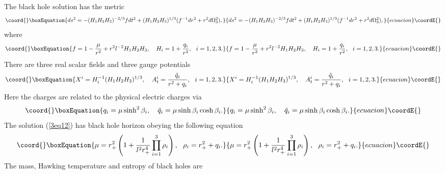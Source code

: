 \documentclass[a4paper,12pt]{article}
\begin{document}
The black hole solution has the metric
\begin{equation}\coord{}\boxEquation{
\label{3eq12}
ds^2 =-(H_1H_2H_3)^{-2/3} fdt^2 +(H_1H_2H_3)^{1/3}(f^{-1}dr^2 +r^2d\Omega_3^2),
}{
ds^2 =-(H_1H_2H_3)^{-2/3} fdt^2 +(H_1H_2H_3)^{1/3}(f^{-1}dr^2 +r^2d\Omega_3^2),
}{ecuacion}\coordE{}\end{equation}
where 
\begin{equation}\coord{}\boxEquation{
\label{3eq13}
f =1 -\frac{\mu}{r^2}+r^2l^{-2} H_1 H_2 H_3, \ \ \  H_i=1+\frac{q_i}{r^2}, \ \ 
 i =1, 2, 3.
}{
f =1 -\frac{\mu}{r^2}+r^2l^{-2} H_1 H_2 H_3, \ \ \  H_i=1+\frac{q_i}{r^2}, \ \ 
 i =1, 2, 3.
}{ecuacion}\coordE{}\end{equation}
There are three real scalar fields \coordHE{} and three gauge potentials \coordHE{}  
\begin{equation}\coord{}\boxEquation{
\label{3eq14}
X^i = H_i^{-1}(H_1H_2 H_3)^{1/3}, \ \ \ A^i_t = \frac{\tilde q_i}{r^2 +q_i},
\ \ i=1, 2, 3.
}{
X^i = H_i^{-1}(H_1H_2 H_3)^{1/3}, \ \ \ A^i_t = \frac{\tilde q_i}{r^2 +q_i},
\ \ i=1, 2, 3.
}{ecuacion}\coordE{}\end{equation}
Here the charges \coordHE{} are related to the physical electric charges 
\myHighlight{$\tilde q_i$}\coordHE{} via
\begin{equation}\coord{}\boxEquation{
\label{3eq15}
q_i=\mu \sinh^2\beta_i, \ \ \ \tilde q_i =\mu \sinh\beta_i \cosh\beta_i.
}{
q_i=\mu \sinh^2\beta_i, \ \ \ \tilde q_i =\mu \sinh\beta_i \cosh\beta_i.
}{ecuacion}\coordE{}\end{equation}
The solution (\ref{3eq12}) has black hole horizon \myHighlight{$r_+$}\coordHE{} obeying the following
equation
\begin{equation}\coord{}\boxEquation{
\label{3eq16}
\mu = r_+^2 \left (1+\frac{1}{l^2 r_+^4} \prod _{i=1}^3 \rho_i \right), \ \
 \rho_i =r_+^2 +q_i.
}{
\mu = r_+^2 \left (1+\frac{1}{l^2 r_+^4} \prod _{i=1}^3 \rho_i \right), \ \
 \rho_i =r_+^2 +q_i.
}{ecuacion}\coordE{}\end{equation}  
The mass, Hawking temperature and entropy of black holes are 
\end{document}
